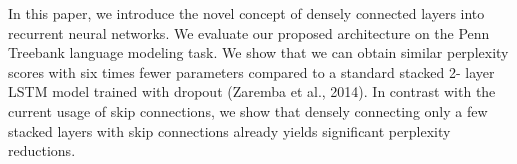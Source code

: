 In this paper, we introduce the novel concept of densely connected layers into recurrent neural networks. We evaluate our proposed architecture on the Penn Treebank language modeling task. We show that we can obtain similar perplexity scores with six times fewer parameters compared to a standard stacked 2- layer LSTM model trained with dropout (Zaremba et al., 2014). In contrast with the current usage of skip connections, we show that densely connecting only a few stacked layers with skip connections already yields significant perplexity reductions.
